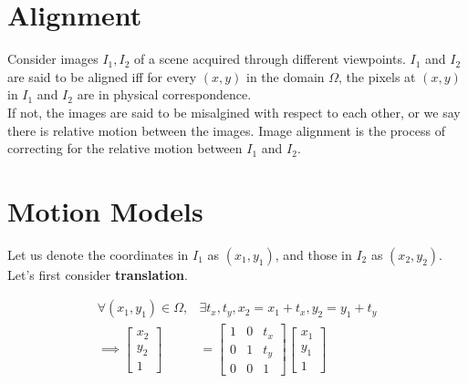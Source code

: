 \documentclass{report}
\begin{document}
\section{Alignment}

\noindent Consider images $I_1,I_2$ of a scene acquired through different viewpoints. $I_1$ and $I_2$ are said to be aligned iff for every $(x,y)$ in the domain $\Omega$, the pixels at $(x,y)$ in $I_1$ and $I_2$ are in physical correspondence. \\

\noindent If not, the images are said to be misalgined with respect to each other, or we say there is relative motion between the images. Image alignment is the process of correcting for the relative motion between $I_1$ and $I_2$.

\section{Motion Models}

\noindent Let us denote the coordinates in $I_1$ as $(x_1,y_1)$, and those in $I_2$ as $(x_2,y_2)$. \\

\noindent Let's first consider \textbf{translation}.

\begin{align}
  \forall (x_1,y_1) \in \Omega, & \exists t_x,t_y, x_2 = x_1 + t_x, y_2 = y_1 + t_y \\
  \implies \begin{bmatrix}
             x_2 \\
             y_2 \\
             1
           \end{bmatrix}
                                & = \begin{bmatrix}
                                      1 & 0 & t_x \\
                                      0 & 1 & t_y \\
                                      0 & 0 & 1
                                    \end{bmatrix} \begin{bmatrix}
                                                    x_1 \\
                                                    y_1 \\
                                                    1
                                                  \end{bmatrix}
\end{align}
\end{document}
